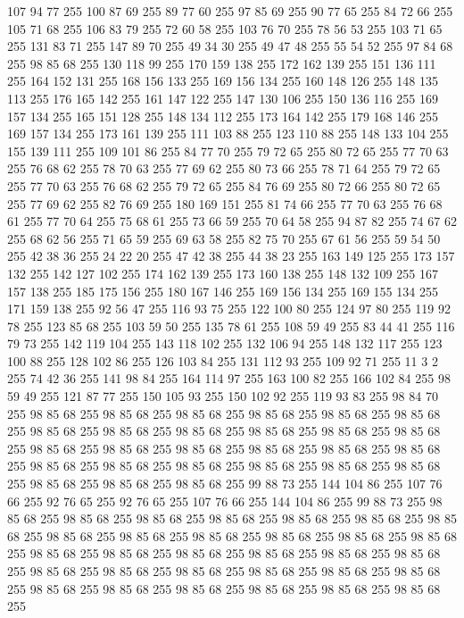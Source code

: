 107 94 77 255 100 87 69 255 89 77 60 255 97 85 69 255 90 77 65 255 84 72 66 255 105 71 68 255 106 83 79 255 72 60 58 255 103 76 70 255 78 56 53 255 103 71 65 255 131 83 71 255 147 89 70 255 49 34 30 255 49 47 48 255 55 54 52 255 97 84 68 255 98 85 68 255 130 118 99 255 170 159 138 255 172 162 139 255 151 136 111 255 164 152 131 255 168 156 133 255 169 156 134 255 160 148 126 255 148 135 113 255 176 165 142 255 161 147 122 255 147 130 106 255 150 136 116 255 169 157 134 255 165 151 128 255 148 134 112 255 173 164 142 255 179 168 146 255 169 157 134 255 173 161 139 255 111 103 88 255 123 110 88 255 148 133 104 255 155 139 111 255 109 101 86 255 84 77 70 255 79 72 65 255 80 72 65 255 77 70 63 255 76 68 62 255 78 70 63 255 77 69 62 255 80 73 66 255 78 71 64 255 79 72 65 255 77 70 63 255 76 68 62 255 79 72 65 255 84 76 69 255 80 72 66 255 80 72 65 255 77 69 62 255 82 76 69 255 180 169 151 255 81 74 66 255
77 70 63 255 76 68 61 255 77 70 64 255 75 68 61 255 73 66 59 255 70 64 58 255 94 87 82 255 74 67 62 255 68 62 56 255 71 65 59 255 69 63 58 255 82 75 70 255 67 61 56 255 59 54 50 255 42 38 36 255 24 22 20 255 47 42 38 255 44 38 23 255 163 149 125 255 173 157 132 255 142 127 102 255 174 162 139 255 173 160 138 255 148 132 109 255 167 157 138 255 185 175 156 255 180 167 146 255 169 156 134 255 169 155 134 255 171 159 138 255 92 56 47 255 116 93 75 255 122 100 80 255 124 97 80 255 119 92 78 255 123 85 68 255 103 59 50 255 135 78 61 255 108 59 49 255 83 44 41 255 116 79 73 255 142 119 104 255 143 118 102 255 132 106 94 255 148 132 117 255 123 100 88 255 128 102 86 255 126 103 84 255 131 112 93 255 109 92 71 255 11 3 2 255 74 42 36 255 141 98 84 255 164 114 97 255 163 100 82 255 166 102 84 255 98 59 49 255 121 87 77 255 150 105 93 255 150 102 92 255 119 93 83 255 98 84 70 255 98 85 68 255 98 85 68 255
98 85 68 255 98 85 68 255 98 85 68 255 98 85 68 255 98 85 68 255 98 85 68 255 98 85 68 255 98 85 68 255 98 85 68 255 98 85 68 255 98 85 68 255 98 85 68 255 98 85 68 255 98 85 68 255 98 85 68 255 98 85 68 255 98 85 68 255 98 85 68 255 98 85 68 255 98 85 68 255 98 85 68 255 98 85 68 255 98 85 68 255 98 85 68 255 98 85 68 255 99 88 73 255 144 104 86 255 107 76 66 255 92 76 65 255 92 76 65 255 107 76 66 255 144 104 86 255 99 88 73 255 98 85 68 255 98 85 68 255 98 85 68 255 98 85 68 255 98 85 68 255 98 85 68 255 98 85 68 255 98 85 68 255 98 85 68 255 98 85 68 255 98 85 68 255 98 85 68 255 98 85 68 255 98 85 68 255 98 85 68 255 98 85 68 255 98 85 68 255 98 85 68 255 98 85 68 255 98 85 68 255 98 85 68 255 98 85 68 255 98 85 68 255 98 85 68 255 98 85 68 255 98 85 68 255 98 85 68 255 98 85 68 255 98 85 68 255 98 85 68 255 98 85 68 255
